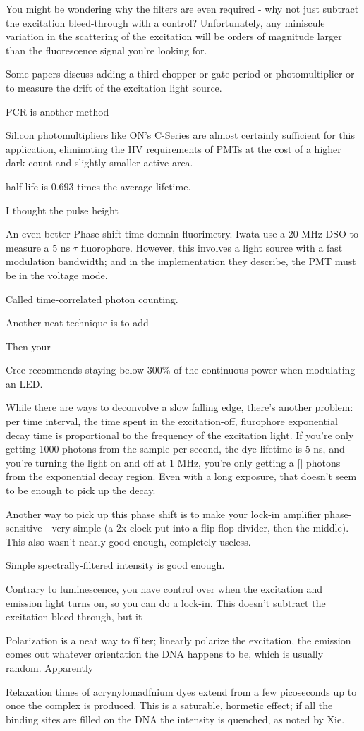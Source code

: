 \documentclass[paper.tex]{subfiles}
\begin{document}
You might be wondering why the filters are even required - why not just subtract the excitation bleed-through with a control? Unfortunately, any miniscule variation in the scattering of the excitation will be orders of magnitude larger than the fluorescence signal you’re looking for.

Some papers discuss adding a third chopper or gate period or photomultiplier or to measure the drift of the excitation light source.



PCR is another method


Silicon photomultipliers like ON's C-Series are almost certainly sufficient for this application, eliminating the HV requirements of PMTs at the cost of a higher dark count and slightly smaller active area.

half-life is 0.693 times the average lifetime. 


I thought the pulse height

An even better Phase-shift time domain fluorimetry. Iwata use a 20 MHz DSO to measure a 5 ns $\tau$ fluorophore. However, this involves a light source with a fast modulation bandwidth; and in the implementation they describe, the PMT must be in the voltage mode.

Called time-correlated photon counting.

Another neat technique is to add

Then your 

Cree recommends staying below 300\% of the continuous power when modulating an LED.

While there are ways to deconvolve a slow falling edge, there’s another problem: per time interval, the time spent in the excitation-off, flurophore exponential decay time is proportional to the frequency of the excitation light. If you’re only getting 1000 photons from the sample per second, the dye lifetime is 5 ns, and you’re turning the light on and off at 1 MHz, you’re only getting a [] photons from the exponential decay region. Even with a long exposure, that doesn’t seem to be enough to pick up the decay. 

Another way to pick up this phase shift is to make your lock-in amplifier phase-sensitive - very simple (a 2x clock put into a flip-flop divider, then the middle). This also wasn’t nearly good enough, completely useless. 

Simple spectrally-filtered intensity is good enough.

Contrary to luminescence, you have control over when the excitation and emission light turns on, so you can do a lock-in. This doesn’t subtract the excitation bleed-through, but it 

Polarization is a neat way to filter; linearly polarize the excitation, the emission comes out whatever orientation the DNA happens to be, which is usually random. Apparently

Relaxation times of acrynylomadfnium dyes extend from a few picoseconds up to once the complex is produced. This is a saturable, hormetic effect; if all the binding sites are filled on the DNA the intensity is quenched, as noted by Xie. 
\end{document}
